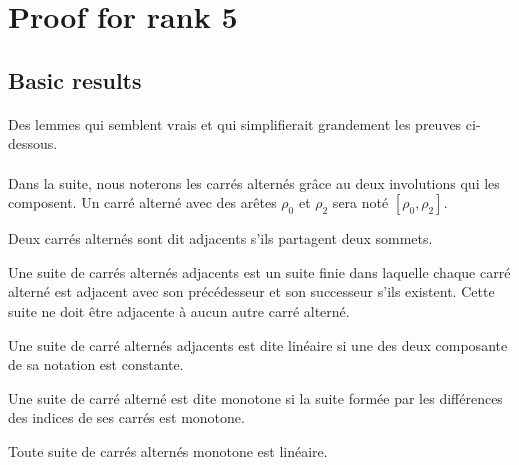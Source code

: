 \section{Proof for rank 5}


\subsection{Basic results}

\paragraph{}
Des lemmes qui semblent vrais et qui simplifierait grandement les preuves ci-dessous.

\paragraph{}
Dans la suite, nous noterons les carrés alternés grâce au deux involutions qui les composent. Un carré alterné avec des arêtes $\rho_0$ et $\rho_2$ sera noté $[\rho_0, \rho_2]$.

\begin{definition}
  Deux carrés alternés sont dit adjacents s'ils partagent deux sommets.
\end{definition}

\begin{definition}
  Une suite de carrés alternés adjacents est un suite finie dans laquelle chaque carré alterné est adjacent avec son précédesseur et son successeur s'ils existent. Cette suite ne doit être adjacente à aucun autre carré alterné.
\end{definition}

\begin{definition}
  Une suite de carré alternés adjacents est dite linéaire si une des deux composante de sa notation est constante.
\end{definition}

\begin{definition}
  Une suite de carré alterné est dite monotone si la suite formée par les différences des indices de ses carrés est monotone.
\end{definition}

\begin{proposition}
  Toute suite de carrés alternés monotone est linéaire.
\end{proposition}


